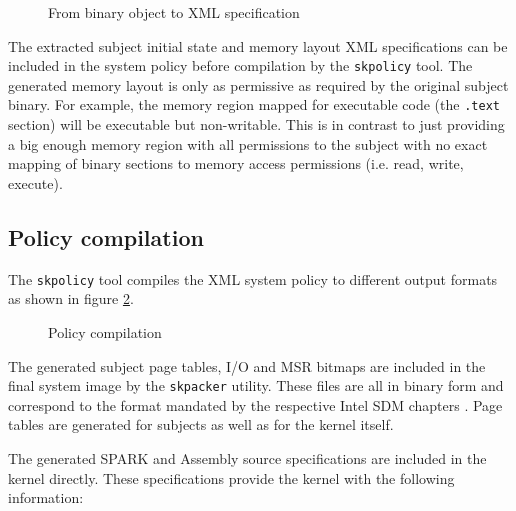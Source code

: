 \begin{figure}[h]
	\centering
	
	\caption{From binary object to XML specification}
	\label{fig:object-analysis}
\end{figure}

The extracted subject initial state and memory layout XML specifications can be
included in the system policy before compilation by the \texttt{skpolicy} tool.
The generated memory layout is only as permissive as required by the original
subject binary. For example, the memory region mapped for executable code
(the \texttt{.text} section) will be executable but non-writable. This is in
contrast to just providing a big enough memory region with all permissions to
the subject with no exact mapping of binary sections to memory access
permissions (i.e. read, write, execute).

\subsection{Policy compilation}\label{subsec:policy-compilation}
The \texttt{skpolicy} tool compiles the XML system policy to different output
formats as shown in figure \ref{fig:policy-compilation}.

\begin{figure}[h]
	\centering
	
	\caption{Policy compilation}
	\label{fig:policy-compilation}
\end{figure}

The generated subject page tables, I/O and MSR bitmaps are included in the
final system image by the \texttt{skpacker} utility. These files are all in
binary form and correspond to the format mandated by the respective Intel SDM
chapters \cite{IntelSDM}. Page tables are generated for subjects as well as
for the kernel itself.

The generated SPARK and Assembly source specifications are included in the
kernel directly. These specifications provide the kernel with the following
information:

